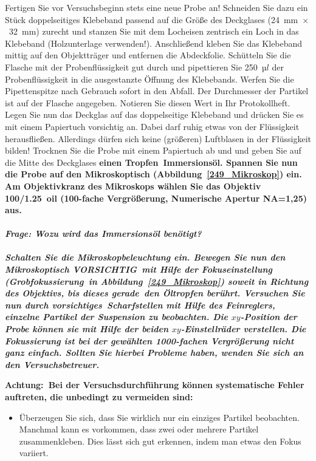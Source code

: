 \documentclass{../papanleitung}
\begin{document}
\begin{enumerate}
Fertigen Sie vor Versuchsbeginn stets eine neue Probe an!
Schneiden Sie dazu ein St\"{u}ck doppelseitiges Klebeband passend auf
die Gr\"{o}{\ss}e des Deckglases (24~mm~$\times$~32~mm) zurecht und
stanzen Sie mit dem Locheisen zentrisch ein Loch in das Klebeband
(Holzunterlage verwenden!). Anschlie{\ss}end kleben Sie das Klebeband
mittig auf den Objekttr\"{a}ger und entfernen die Abdeckfolie.
Sch\"{u}tteln Sie die Flasche mit der Probenfl\"{u}ssigkeit gut durch und
pipettieren Sie 250~$µl$ der Probenfl\"{u}ssigkeit in die ausgestanzte
\"{O}ffnung des Klebebands. Werfen Sie die Pipettenspitze nach
Gebrauch sofort in den Abfall. Der Durchmesser der Partikel ist
auf der Flasche angegeben. Notieren Sie diesen Wert in Ihr
Protokollheft. Legen Sie nun das Deckglas auf das doppelseitige
Klebeband und dr\"{u}cken Sie es mit einem Papiertuch vorsichtig an.
Dabei darf ruhig etwas von der Fl\"{u}ssigkeit herausflie{\ss}en.
Allerdings d\"{u}rfen sich keine (gr\"{o}{\ss}eren) Luftblasen in der
Fl\"{u}ssigkeit bilden! Trocknen Sie die Probe mit einem Papiertuch ab
und und geben Sie auf die Mitte des Deckglases \bf einen
Tropfen\rm~Immersions\"{o}l. Spannen Sie nun die Probe auf den
Mikroskoptisch (Abbildung~\ref{249_Mikroskop}) ein.  Am
Objektivkranz des Mikroskops w\"{a}hlen Sie das Objektiv 100/1.25~oil
(100-fache Vergr\"{o}{\ss}erung, Numerische Apertur NA=1,25)
aus.\\
\\\it Frage: Wozu wird das Immersions\"{o}l ben\"{o}tigt?\rm\\
\\
Schalten Sie die Mikroskopbeleuchtung ein. Bewegen Sie nun den
Mikroskoptisch \bf VORSICHTIG\rm~mit Hilfe der Fokuseinstellung
(\it Grobfokussierung\rm~in Abbildung~\ref{249_Mikroskop}) soweit
in Richtung des Objektivs, bis dieses \bf gerade\rm~den \"{O}ltropfen
ber\"{u}hrt. Versuchen Sie nun durch \bf
vorsichtiges\rm~Scharf\-stellen mit Hilfe des Feinreglers,
einzelne Partikel der Suspension zu beobachten. Die $xy$-Position
der Probe k\"{o}nnen sie mit Hilfe der beiden $xy$-Einstellr\"{a}der
verstellen. Die Fokussierung ist bei der gew\"{a}hlten 1000-fachen
Vergr\"{o}{\ss}erung nicht ganz einfach. Sollten Sie hierbei Probleme
haben, wenden Sie sich an den Versuchsbetreuer.

\bf Achtung:\rm~Bei der Versuchsdurchf\"{u}hrung k\"{o}nnen systematische
Fehler auftreten, die unbedingt zu vermeiden sind:
\begin{itemize}
\item \"{U}berzeugen Sie sich, dass  Sie wirklich nur ein einziges
Partikel beobachten. Manchmal kann es vorkommen, dass zwei oder
mehrere Partikel \glqq zusammenkleben\grqq. Dies l\"{a}sst sich gut
erkennen, indem man etwas den Fokus variiert.


\end{itemize}
\end{enumerate}
\end{document}
